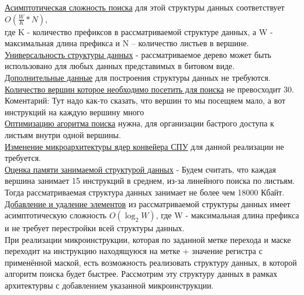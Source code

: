 \documentclass[a4peper, 12pt, titlepage, finall]{report}
\begin{document}
            \underline{Асимптотическая сложность поиска} для этой структуры данных соответствует {\ttfamily $O(\frac{W}{K}*N)$},\\
            где {\ttfamily K} - количество префиксов в рассматриваемой структуре данных, а {\ttfamily W} - максимальная длина префикса
            и {\ttfamily N} -- количество листьев в вершине.\\
            \underline{Универсальность структуры данных} - рассматриваемое дерево может быть использовано для любых данных представимых в битовом виде.\\
            \underline{Дополнительные данные} для построения структуры данных не требуются.\\
            \underline{Количество вершин которое необходимо посетить для поиска} не превосходит 30. 
            {\ttfamily Коментарий: Тут надо как-то сказать, что вершин то мы посещяем мало, а вот инструкций на каждую вершину много}\\
            \underline{Оптимизацию агоритма поиска} нужна, для организации бастрого доступа к листьям внутри одной вершины.\\ 
            \underline{Изменение микроархитектуры ядер конвейера СПУ} для данной реализации не требуется.\\
            \underline{Оценка памяти занимаемой структурой данных} - Будем считать, что каждая вершина занимает 15 инструкций в среднем, из-за линейного поиска по листьям. 
            Тогда рассматриваемая структура данных занимает не более чем 18000 Кбайт.\\
            \underline{Добавление и удаление элементов} из рассматриваемой структуры данных имеет асимптотическую сложность 
            {\ttfamily $O(\log_2{W})$}, где {\ttfamily W} - максимальная длина префикса и не требует перестройки всей структуры данных.\\
            
            При реализации микроинструкции, которая по заданной метке перехода и маске переходит на инструкцию находящуюся на метке + значение регистра с применённой маской,
            есть возможность реализовать структуру данных, в которой алгоритм поиска будет быстрее. Рассмотрим эту структуру данных в рамках архитектурвы с добавлением указанной микроинструкции.\\
\end{document}
